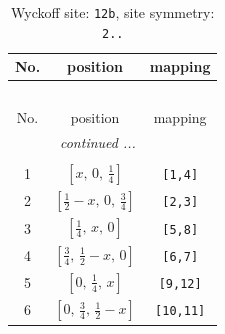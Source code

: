 \documentclass[fleqn,8pt]{jsarticle}
\begin{document}
\begin{longtable}{ccc}
\caption{Wyckoff site: {\tt 12b}, site symmetry: {\tt 2..}}
 \\
 \hline \hline
No. & position & mapping \\ \hline \endfirsthead

\multicolumn{2}{l}{\tablename\ \thetable{}} \\
 \hline \hline
No. & position & mapping \\ \hline \endhead

 \hline \hline
\multicolumn{2}{r}{\footnotesize\it continued ...} \\ \endfoot

 \hline \hline
\multicolumn{2}{r}{} \\ \endlastfoot

1 & $\left[ x,\, 0,\, \frac{1}{4} \right]$ & {\tt [1,4]} \\ \hline
2 & $\left[ \frac{1}{2} - x,\, 0,\, \frac{3}{4} \right]$ & {\tt [2,3]} \\ \hline
3 & $\left[ \frac{1}{4},\, x,\, 0 \right]$ & {\tt [5,8]} \\ \hline
4 & $\left[ \frac{3}{4},\, \frac{1}{2} - x,\, 0 \right]$ & {\tt [6,7]} \\ \hline
5 & $\left[ 0,\, \frac{1}{4},\, x \right]$ & {\tt [9,12]} \\ \hline
6 & $\left[ 0,\, \frac{3}{4},\, \frac{1}{2} - x \right]$ & {\tt [10,11]} \\
\end{longtable}
\renewcommand{\arraystretch}{1.2}
\end{document}
